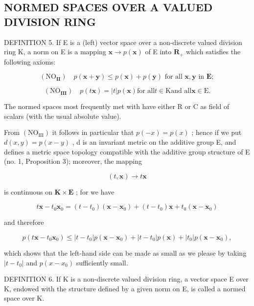 \subsection{NORMED SPACES OVER A VALUED DIVISION RING}

DEFINITION 5. If E is a (left) vector space over a non-discrete valued division ring K, a norm on E is a mapping \(\mathbf{x} \to p(\mathbf{x})\) of E into \(\mathbf{R}_+\) which satisfies the following axioms:

\[
\left(\mathrm{NO} _ {\mathbf {I I}}\right) \quad p (\boldsymbol {x} + \boldsymbol {y}) \leqslant p (\boldsymbol {x}) + p (\boldsymbol {y}) \text {   for   all   } \boldsymbol {x}, \boldsymbol {y} \text {   in   } \mathbf {E};
\]

\[
\left(\mathrm{NO} _ {\mathbf {I I I}}\right) \quad p (t \boldsymbol {x}) = | t | p (\boldsymbol {x}) \text {for all} t \in \mathrm{K} \text {and all} \boldsymbol {x} \in \mathrm{E}.
\]

The normed spaces most frequently met with have either R or C as field of scalars (with the usual absolute value).

From \((\mathrm{NO}_{\mathrm{III}})\) it follows in particular that \(p(-x)=p(x)\) ; hence if we put \(d(x,y)=p(x-y)\) , d is an invariant metric on the additive group E, and defines a metric space topology compatible with the additive group structure of E (no. 1, Proposition 3); moreover, the mapping

\[
(t, \boldsymbol {x}) \rightarrow t \boldsymbol {x}
\]

is continuous on \(\mathbf{K} \times \mathbf{E}\) ; for we have

\[
t \boldsymbol {x} - t _ {0} \boldsymbol {x} _ {0} = (t - t _ {0}) (\boldsymbol {x} - \boldsymbol {x} _ {0}) + (t - t _ {0}) \boldsymbol {x} + t _ {0} (\boldsymbol {x} - \boldsymbol {x} _ {0})
\]

and therefore

\[
p (t \boldsymbol {x} - t _ {0} \boldsymbol {x} _ {0}) \leqslant | t - t _ {0} | p (\boldsymbol {x} - \boldsymbol {x} _ {0}) + | t - t _ {0} | p (\boldsymbol {x}) + | t _ {0} | p (\boldsymbol {x} - \boldsymbol {x} _ {0}),
\]

which shows that the left-hand side can be made as small as we please by taking \(|t - t_{0}|\) and \(p(x - x_{0})\) sufficiently small.

DEFINITION 6. If K is a non-discrete valued division ring, a vector space E over K, endowed with the structure defined by a given norm on E, is called a normed space over K.

